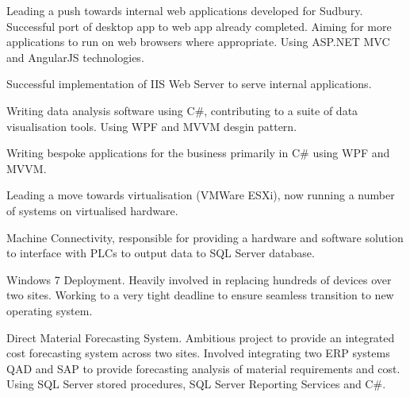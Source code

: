 \documentclass[a4paper]{deedy-resume} %
\newcommand{\Csh}{C{\lserif\#}}
\begin{document}
\begin{minipage}[t]{0.66\textwidth}
\begin{tightitemize}
\end{tightitemize}

\sectionspace %



\vspace{\topsep} %
\begin{tightitemize}
\item Leading a push towards internal web applications developed for Sudbury. Successful port of desktop app to web app already completed. Aiming for more applications to run on web browsers where appropriate. Using ASP.NET MVC and AngularJS technologies.
\item Successful implementation of IIS Web Server to serve internal applications.
\item Writing data analysis software using \Csh{}, contributing to a suite of data visualisation tools. Using WPF and MVVM desgin pattern.
\item Writing bespoke applications for the business primarily in \Csh{} using WPF and MVVM.
\item Leading a move towards virtualisation (VMWare ESXi), now running a number of systems on virtualised hardware.
\item Machine Connectivity, responsible for providing a hardware and software solution to interface with PLCs to output data to SQL Server database.
\item Windows 7 Deployment. Heavily involved in replacing hundreds of devices over two sites. Working to a very tight deadline to ensure seamless transition to new operating system.
\item Direct Material Forecasting System. Ambitious project to provide an integrated cost forecasting system across two sites. Involved integrating two ERP systems QAD and SAP to provide forecasting analysis of material requirements and cost. Using SQL Server stored procedures, SQL Server Reporting Services and \Csh{}.
\end{tightitemize}

\sectionspace %


\end{minipage} %
\end{document}
